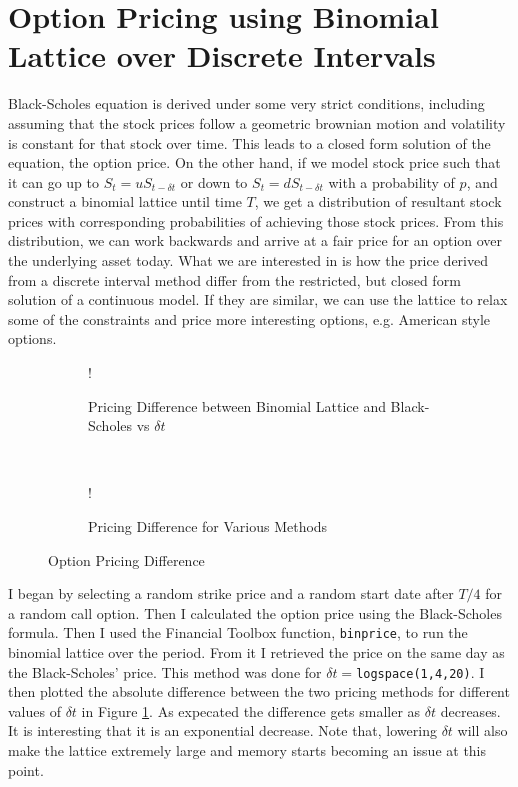 \documentclass[11pt, fleqn]{article}
\begin{document}
\section{Option Pricing using Binomial Lattice over Discrete Intervals}

Black-Scholes equation is derived under some very strict conditions, including assuming that the stock prices follow a geometric brownian motion and volatility is constant for that stock over time. This leads to a closed form solution of the equation, the option price. On the other hand, if we model stock price such that it can go up to $S_t = uS_{t-\delta t}$ or down to $S_t = dS_{t-\delta t}$ with a probability of $p$, and construct a binomial lattice until time $T$, we get a distribution of resultant stock prices with corresponding probabilities of achieving those stock prices. From this distribution, we can work backwards and arrive at a fair price for an option over the underlying asset today. What we are interested in is how the price derived from a discrete interval method differ from the restricted, but closed form solution of a continuous model. If they are similar, we can use the lattice to relax some of the constraints and price more interesting options, e.g. American style options.

\begin{figure}[!h]
   \centering 
   \begin{subfigure}[b]{0.45\textwidth}
     	\resizebox {\textwidth} {!} { }
		\caption{Pricing Difference between Binomial Lattice and Black-Scholes vs $\delta t$}
		\label{fig:q4-bls-vs-binomial}
    \end{subfigure}
    ~
    \begin{subfigure}[b]{0.44\textwidth}
       	\resizebox {\textwidth} {!} { }
		\caption{Pricing Difference for Various Methods}
        \label{fig:q4-bls-vs-binomial-vs-monte-error}
    \end{subfigure}
    \caption{Option Pricing Difference}
	\label{fig:pricing-difference}
\end{figure}

I began by selecting a random strike price and a random start date after $T/4$ for a random call option. Then I calculated the option price using the Black-Scholes formula. Then I used the Financial Toolbox function, \texttt{binprice}, to run the binomial lattice over the period. From it I retrieved the price on the same day as the Black-Scholes' price. This method was done for $\delta t = $\texttt{logspace(1,4,20)}. I then plotted the absolute difference between the two pricing methods for different values of $\delta t$ in Figure \ref{fig:q4-bls-vs-binomial}. As expecated the difference gets smaller as $\delta t$ decreases. It is interesting that it is an exponential decrease. Note that, lowering $\delta t$ will also make the lattice extremely large and memory starts becoming an issue at this point.\\
\end{document}
